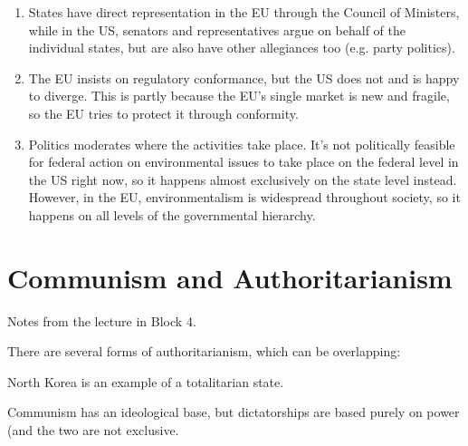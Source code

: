 \begin{enumerate}
  \item States have direct representation in the EU through the Council
    of Ministers, while in the US, senators and representatives argue on
    behalf of the individual states, but are also have other allegiances
    too (e.g. party politics).
  \item The EU insists on regulatory conformance, but the US does not
    and is happy to diverge. This is partly because the EU's single
    market is new and fragile, so the EU tries to protect it through
    conformity.
  \item Politics moderates where the activities take place. It's not
    politically feasible for federal action on environmental issues to
    take place on the federal level in the US right now, so it happens
    almost exclusively on the state level instead. However, in the EU,
    environmentalism is widespread throughout society, so it happens
    on all levels of the governmental hierarchy.
\end{enumerate}

\section{Communism and Authoritarianism}
\begin{flushright}
  \scriptsize Notes from the lecture in Block 4.
\end{flushright}


There are several forms of authoritarianism, which can be
overlapping:


 North Korea is an example of a totalitarian state.




 Communism has an ideological
base, but dictatorships are based purely on power (and the two are not
exclusive.

